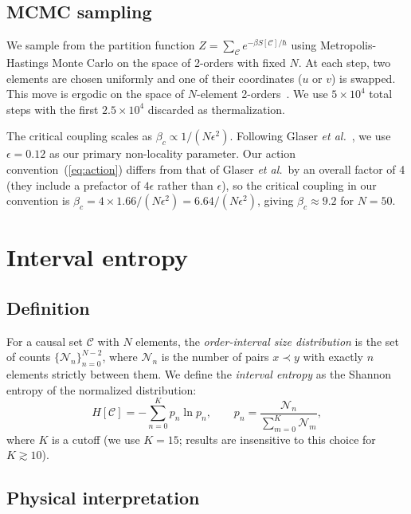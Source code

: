 \documentclass[aps,prd,twocolumn,superscriptaddress,nofootinbib]{revtex4-2}
\begin{document}
\subsection{MCMC sampling}

We sample from the partition function $Z = \sum_{\mathcal{C}} e^{-\beta S[\mathcal{C}]/\hbar}$ using Metropolis-Hastings Monte Carlo on the space of 2-orders with fixed $N$. At each step, two elements are chosen uniformly and one of their coordinates ($u$ or $v$) is swapped. This move is ergodic on the space of $N$-element 2-orders~\cite{surya2012}. We use $5 \times 10^4$ total steps with the first $2.5 \times 10^4$ discarded as thermalization.

The critical coupling scales as $\beta_c \propto 1/(N \epsilon^2)$. Following Glaser \emph{et al.}~\cite{glaser2018}, we use $\epsilon = 0.12$ as our primary non-locality parameter. Our action convention~(\ref{eq:action}) differs from that of Glaser \emph{et al.}\ by an overall factor of 4 (they include a prefactor of $4\epsilon$ rather than $\epsilon$), so the critical coupling in our convention is $\beta_c = 4 \times 1.66 / (N\epsilon^2) = 6.64 / (N\epsilon^2)$, giving $\beta_c \approx 9.2$ for $N = 50$.

\section{Interval entropy}

\subsection{Definition}

For a causal set $\mathcal{C}$ with $N$ elements, the \emph{order-interval size distribution} is the set of counts $\{\mathcal{N}_n\}_{n=0}^{N-2}$, where $\mathcal{N}_n$ is the number of pairs $x \prec y$ with exactly $n$ elements strictly between them. We define the \emph{interval entropy} as the Shannon entropy of the normalized distribution:
\begin{equation}
H[\mathcal{C}] = -\sum_{n=0}^{K} p_n \ln p_n, \qquad p_n = \frac{\mathcal{N}_n}{\sum_{m=0}^{K} \mathcal{N}_m},
\end{equation}
where $K$ is a cutoff (we use $K = 15$; results are insensitive to this choice for $K \gtrsim 10$).

\subsection{Physical interpretation}
\end{document}
